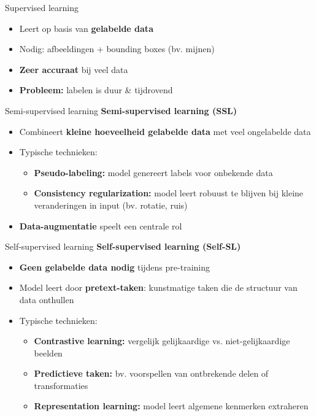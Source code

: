 \documentclass[aspectratio=169]{beamer}
\begin{document}
    \begin{frame}{Supervised learning}
        \begin{itemize}
            \item Leert op basis van \textbf{gelabelde data}
            \item Nodig: afbeeldingen + bounding boxes (bv. mijnen)
            \item \textbf{Zeer accuraat} bij veel data
            \item \textbf{Probleem:} labelen is duur \& tijdrovend
        \end{itemize}
    \end{frame}
    
    \begin{frame}{Semi-supervised learning}
        \textbf{Semi-supervised learning (SSL)}
        \begin{itemize}
            \item Combineert \textbf{kleine hoeveelheid gelabelde data} met veel ongelabelde data
            \item Typische technieken:
            \begin{itemize}
                \item \textbf{Pseudo-labeling:} model genereert labels voor onbekende data
                \item \textbf{Consistency regularization:} model leert robuust te blijven bij kleine veranderingen in input (bv. rotatie, ruis)
            \end{itemize}
            \item \textbf{Data-augmentatie} speelt een centrale rol
        \end{itemize}
    \end{frame}
    
    \begin{frame}{Self-supervised learning}
        \textbf{Self-supervised learning (Self-SL)}
        \begin{itemize}
            \item \textbf{Geen gelabelde data nodig} tijdens pre-training
            \item Model leert door \textbf{pretext-taken}: kunstmatige taken die de structuur van data onthullen
            \item Typische technieken:
            \begin{itemize}
                \item \textbf{Contrastive learning:} vergelijk gelijkaardige vs. niet-gelijkaardige beelden
                \item \textbf{Predictieve taken:} bv. voorspellen van ontbrekende delen of transformaties
                \item \textbf{Representation learning:} model leert algemene kenmerken extraheren
            \end{itemize}
        \end{itemize}
    \end{frame}
    
\end{document}
